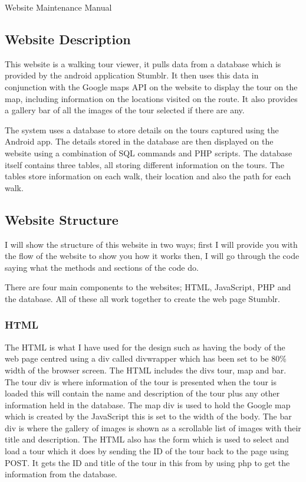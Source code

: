 \documentclass{article}
\begin{document}
	\clearpage
	\begin{section}{Website Maintenance Manual}
		\subsection{Website Description}
		This website is a walking tour viewer, it pulls data from a database which is provided by the android application Stumblr. It then uses this data in conjunction with the Google maps API on the website to display the tour on the map, including information on the locations visited on the route. It also provides a gallery bar of all the images of the tour selected if there are any.
		
		The system uses a database to store details on the tours captured using the Android app. The details stored in the database are then displayed on the website using a combination of SQL commands and PHP scripts. The database itself contains three tables, all storing different information on the tours. The tables store information on each walk, their location and also the path for each walk. 

		\subsection{Website Structure}
		I will show the structure of this website in two ways; first I will provide you with the flow of the website to show you how it works then, I will go through the code saying what the methods and sections of the code do.

		There are four main components to the websites; HTML, JavaScript, PHP and the database. All of  these all work together to create the web page Stumblr. 

		\subsubsection{HTML}
The HTML is what I have used for the design such as having the body of the web page centred using a div called divwrapper which has been set to be 80\% width of the browser screen. The HTML includes the divs tour, map and bar. The tour div is where information of the tour is presented when the tour is loaded this will contain the name and description of the tour plus any other information held in the database. The map div is used to hold the Google map which is created by the JavaScript this is set to the width of the body. The bar div is where the gallery of images is shown as a scrollable list of images with their title and description. The HTML also has the form which is used to select and load a tour which it does by sending the ID of the tour back to the page using POST. It gets the ID and title of the tour in this from by using php to get the information from the database.


\end{section}
\end{document}
